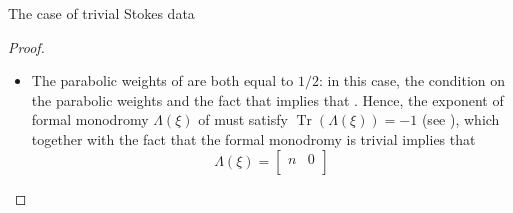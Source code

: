 \documentclass[11pt]{article}
\numberwithin{equation}{section}
\numberwithin{equation}{section}
\newcommand{\CP}{\mathbb{C}P^1}
\begin{document}
\begin{subsubsection}{The case of trivial Stokes data}
\begin{proof}
\begin{itemize}
This connection has a frame of flat sections defined over $\mathbb{C} \subset \CP$, given by $g_0\cdot \exp \smash{\bigl(\bigl(-\frac{z^2\xi^{-1}}{2}}\allowbreak-\smash{\frac{\overline{z}^{2}\xi}{2}\bigr)H\bigr)}$ satisfying the appropriate asymptotics with respect to $\tau_0^{\xi}$ (and $g_0$). From this fact, we see that the formal monodromy and the associated Stokes matrices are trivial.
Now going back to , the fact that it comes from a harmonic bundle implies that , while the assumption on the parabolic weights imply that . Since it also has trivial Stokes data, the Riemann--Hilbert correspondence for framed flat bundles presented in $\cite{BB04}$ implies that  is isomorphic to  (as compatibly framed flat bundles). In particular,  is isomorphic with , so that  is isomorphic to $\bigl(E_0,\overline{\partial}_{E_0},\theta_0,h_0\bigr)$. Hence,
\begin{equation*}
 -\bigl(z^2+2m\bigr){\rm d}z^2=\operatorname{Det}(\theta)=\operatorname{Det}(\theta_0)=-z^2{\rm d}z^2,
\end{equation*} which implies that $m=0$.
\item The parabolic weights of  are both equal to $1/2$: in this case, the condition on the parabolic weights and the fact that  implies that . Hence, the exponent of formal monodromy $\Lambda(\xi)$ of  must satisfy $\operatorname{Tr}(\Lambda(\xi))\allowbreak=-1$ (see \cite{B}), which together with the fact that the formal monodromy is trivial implies that
\begin{equation*}
 \Lambda(\xi)=\begin{bmatrix} n & 0 \\

\end{bmatrix}
\end{equation*}
\end{itemize}
\end{proof}
\end{subsubsection}
\end{document}
